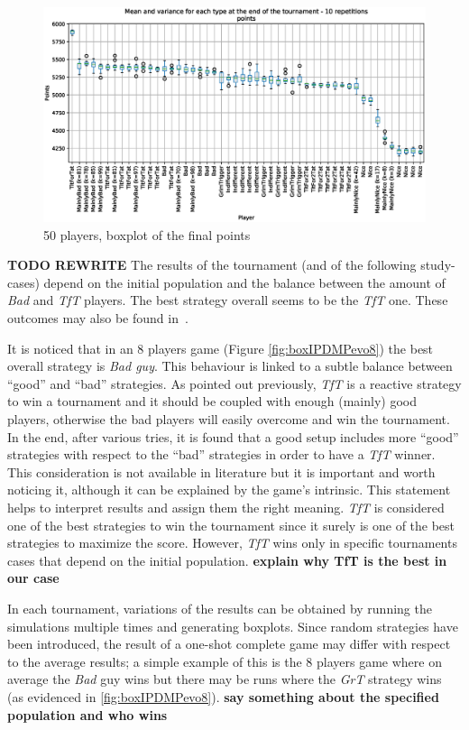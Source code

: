 \documentclass[journal,a4paper,10pt,twoside]{IEEEtran} %
\begin{document}
\begin{figure}[!ht]
    \centering
    \includegraphics[width=1\columnwidth]{../img/ipdmp/ipdmp-boxplot-final-points-50}
    \caption{50 players, boxplot of the final points}
    \label{fig:boxIPDMPfinal}
\end{figure}

\textbf{TODO REWRITE}
The results of the tournament (and of the following study-cases) depend on the initial population and the balance between the amount of \textit{Bad} and \textit{TfT} players. The best strategy overall seems to be the \textit{TfT} one.
These outcomes may also be found in~\cite{mathieu2017}.

It is noticed that in an 8 players game (Figure \ref{fig:boxIPDMPevo8}) the best overall strategy is \textit{Bad guy}. This behaviour is linked to a subtle balance between ``good'' and ``bad'' strategies. As pointed out previously, \textit{TfT} is a reactive strategy to win a tournament and it should be coupled with enough (mainly) good players, otherwise the bad players will easily overcome and win the tournament. In the end, after various tries, it is found that a good setup includes more ``good'' strategies with respect to the ``bad'' strategies in order to have a \textit{TfT} winner. This consideration is not available in literature but it is important and worth noticing it, although it can be explained by the game's intrinsic. This statement helps to interpret results and assign them the right meaning. \textit{TfT} is considered one of the best strategies to win the tournament since it surely is one of the best strategies to maximize the score. However, \textit{TfT} wins only in specific tournaments cases that depend on the initial population.
\textbf{explain why TfT is the best in our case}

In each tournament, variations of the results can be obtained by running the simulations multiple times and generating boxplots.
Since random strategies have been introduced, the result of a one-shot complete game may differ with respect to the average results; a simple example of this is the 8 players game where on average the \textit{Bad} guy wins but there may be runs where the \textit{GrT} strategy wins (as evidenced in \autoref{fig:boxIPDMPevo8}).
\textbf{say something about the specified population and who wins}
\end{document}
